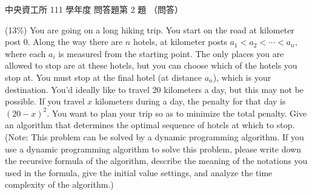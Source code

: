 \begin{pastexam}[label={px:ncu-111-dsa-14}]{中央資工所 111 學年度 問答題第 2 題}
（問答）

(13\%) You are going on a long hiking trip. You start on the road at kilometer post 0. Along the way
there are $n$ hotels, at kilometer posts $a_1 < a_2 < \cdots < a_n$, where each $a_i$ is measured
from the starting point. The only places you are allowed to stop are at these hotels, but you can
choose which of the hotels you stop at. You must stop at the final hotel (at distance $a_n$), which
is your destination. You'd ideally like to travel 20 kilometers a day, but this may not be
possible. If you travel $x$ kilometers during a day, the penalty for that day is $(20-x)^2$. You
want to plan your trip so as to minimize the total penalty. Give an algorithm that determines the
optimal sequence of hotels at which to stop. (Note: This problem can be solved by a dynamic
programming algorithm. If you use a dynamic programming algorithm to solve this problem, please
write down the recursive formula of the algorithm, describe the meaning of the notations you used
in the formula, give the initial value settings, and analyze the time complexity of the algorithm.)
\end{pastexam}

